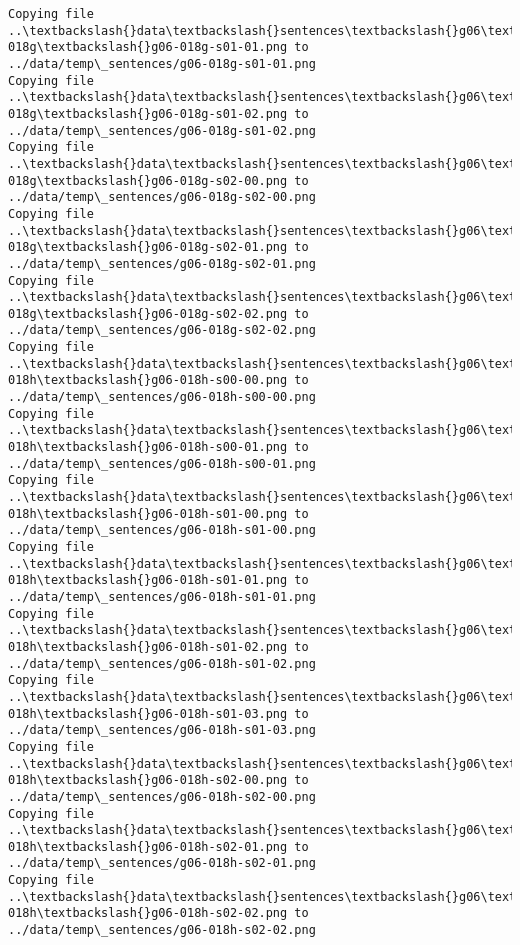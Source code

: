 \documentclass[11pt]{article}
\begin{document}
\begin{Verbatim}[commandchars=\\\{\}]
Copying file ..\textbackslash{}data\textbackslash{}sentences\textbackslash{}g06\textbackslash{}g06-018g\textbackslash{}g06-018g-s01-01.png to
../data/temp\_sentences/g06-018g-s01-01.png
Copying file ..\textbackslash{}data\textbackslash{}sentences\textbackslash{}g06\textbackslash{}g06-018g\textbackslash{}g06-018g-s01-02.png to
../data/temp\_sentences/g06-018g-s01-02.png
Copying file ..\textbackslash{}data\textbackslash{}sentences\textbackslash{}g06\textbackslash{}g06-018g\textbackslash{}g06-018g-s02-00.png to
../data/temp\_sentences/g06-018g-s02-00.png
Copying file ..\textbackslash{}data\textbackslash{}sentences\textbackslash{}g06\textbackslash{}g06-018g\textbackslash{}g06-018g-s02-01.png to
../data/temp\_sentences/g06-018g-s02-01.png
Copying file ..\textbackslash{}data\textbackslash{}sentences\textbackslash{}g06\textbackslash{}g06-018g\textbackslash{}g06-018g-s02-02.png to
../data/temp\_sentences/g06-018g-s02-02.png
Copying file ..\textbackslash{}data\textbackslash{}sentences\textbackslash{}g06\textbackslash{}g06-018h\textbackslash{}g06-018h-s00-00.png to
../data/temp\_sentences/g06-018h-s00-00.png
Copying file ..\textbackslash{}data\textbackslash{}sentences\textbackslash{}g06\textbackslash{}g06-018h\textbackslash{}g06-018h-s00-01.png to
../data/temp\_sentences/g06-018h-s00-01.png
Copying file ..\textbackslash{}data\textbackslash{}sentences\textbackslash{}g06\textbackslash{}g06-018h\textbackslash{}g06-018h-s01-00.png to
../data/temp\_sentences/g06-018h-s01-00.png
Copying file ..\textbackslash{}data\textbackslash{}sentences\textbackslash{}g06\textbackslash{}g06-018h\textbackslash{}g06-018h-s01-01.png to
../data/temp\_sentences/g06-018h-s01-01.png
Copying file ..\textbackslash{}data\textbackslash{}sentences\textbackslash{}g06\textbackslash{}g06-018h\textbackslash{}g06-018h-s01-02.png to
../data/temp\_sentences/g06-018h-s01-02.png
Copying file ..\textbackslash{}data\textbackslash{}sentences\textbackslash{}g06\textbackslash{}g06-018h\textbackslash{}g06-018h-s01-03.png to
../data/temp\_sentences/g06-018h-s01-03.png
Copying file ..\textbackslash{}data\textbackslash{}sentences\textbackslash{}g06\textbackslash{}g06-018h\textbackslash{}g06-018h-s02-00.png to
../data/temp\_sentences/g06-018h-s02-00.png
Copying file ..\textbackslash{}data\textbackslash{}sentences\textbackslash{}g06\textbackslash{}g06-018h\textbackslash{}g06-018h-s02-01.png to
../data/temp\_sentences/g06-018h-s02-01.png
Copying file ..\textbackslash{}data\textbackslash{}sentences\textbackslash{}g06\textbackslash{}g06-018h\textbackslash{}g06-018h-s02-02.png to
../data/temp\_sentences/g06-018h-s02-02.png

\end{Verbatim}
\end{document}
